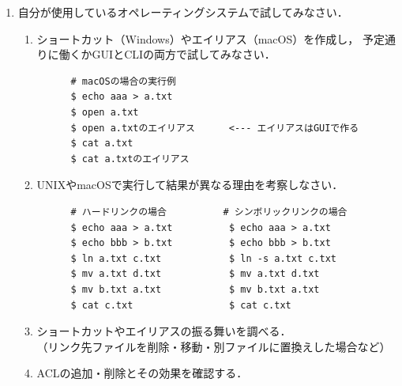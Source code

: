 \begin{enumerate}
\item 自分が使用しているオペレーティングシステムで試してみなさい．
  \begin{enumerate}
  \item ショートカット（Windows）やエイリアス（macOS）を作成し，
    予定通りに働くかGUIとCLIの両方で試してみなさい．
\begin{lstlisting}
      # macOSの場合の実行例
      $ echo aaa > a.txt
      $ open a.txt
      $ open a.txtのエイリアス      <--- エイリアスはGUIで作る
      $ cat a.txt
      $ cat a.txtのエイリアス
\end{lstlisting} %
  \item UNIXやmacOSで実行して結果が異なる理由を考察しなさい．
\begin{lstlisting}
      # ハードリンクの場合          # シンボリックリンクの場合
      $ echo aaa > a.txt          $ echo aaa > a.txt
      $ echo bbb > b.txt          $ echo bbb > b.txt
      $ ln a.txt c.txt            $ ln -s a.txt c.txt
      $ mv a.txt d.txt            $ mv a.txt d.txt
      $ mv b.txt a.txt            $ mv b.txt a.txt
      $ cat c.txt                 $ cat c.txt
\end{lstlisting} %
  \item ショートカットやエイリアスの振る舞いを調べる．\\
    （リンク先ファイルを削除・移動・別ファイルに置換えした場合など）
  \item ACLの追加・削除とその効果を確認する．
  \end{enumerate}

\end{enumerate}
